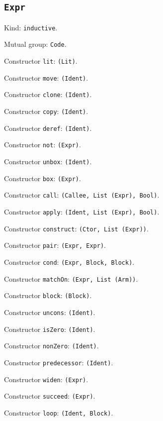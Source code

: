 \documentclass[11pt]{article}
\begin{document}
\subsection*{\texttt{Expr}}
\noindent Kind: \texttt{inductive}.\par
\noindent Mutual group: \texttt{Code}.\par
\noindent Constructor \texttt{lit}: \texttt{(Lit)}.\par
\noindent Constructor \texttt{move}: \texttt{(Ident)}.\par
\noindent Constructor \texttt{clone}: \texttt{(Ident)}.\par
\noindent Constructor \texttt{copy}: \texttt{(Ident)}.\par
\noindent Constructor \texttt{deref}: \texttt{(Ident)}.\par
\noindent Constructor \texttt{not}: \texttt{(Expr)}.\par
\noindent Constructor \texttt{unbox}: \texttt{(Ident)}.\par
\noindent Constructor \texttt{box}: \texttt{(Expr)}.\par
\noindent Constructor \texttt{call}: \texttt{(Callee, List (Expr), Bool)}.\par
\noindent Constructor \texttt{apply}: \texttt{(Ident, List (Expr), Bool)}.\par
\noindent Constructor \texttt{construct}: \texttt{(Ctor, List (Expr))}.\par
\noindent Constructor \texttt{pair}: \texttt{(Expr, Expr)}.\par
\noindent Constructor \texttt{cond}: \texttt{(Expr, Block, Block)}.\par
\noindent Constructor \texttt{matchOn}: \texttt{(Expr, List (Arm))}.\par
\noindent Constructor \texttt{block}: \texttt{(Block)}.\par
\noindent Constructor \texttt{uncons}: \texttt{(Ident)}.\par
\noindent Constructor \texttt{isZero}: \texttt{(Ident)}.\par
\noindent Constructor \texttt{nonZero}: \texttt{(Ident)}.\par
\noindent Constructor \texttt{predecessor}: \texttt{(Ident)}.\par
\noindent Constructor \texttt{widen}: \texttt{(Expr)}.\par
\noindent Constructor \texttt{succeed}: \texttt{(Expr)}.\par
\noindent Constructor \texttt{loop}: \texttt{(Ident, Block)}.\par
\end{document}

